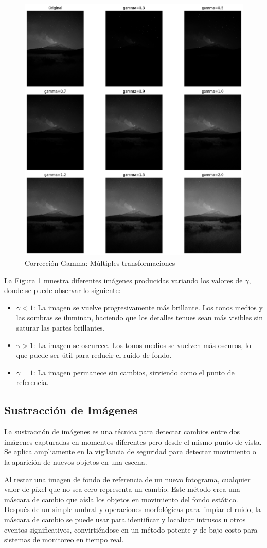 \documentclass[12pt,letterpaper]{article}
\begin{document}
\begin{figure}[H]
  \centering
  \includegraphics[width=0.5\linewidth]{figuras/correccion_gamma.png}
  \caption{Corrección Gamma: Múltiples transformaciones}
  \label{fig:correccion_gamma}
\end{figure}

La Figura \ref{fig:correccion_gamma} muestra diferentes imágenes producidas variando los valores de $\gamma$, donde se puede observar lo siguiente:

\begin{itemize}
  \item \textbf{$\gamma < 1$}: La imagen se vuelve progresivamente más brillante. Los tonos medios y las sombras se iluminan, haciendo que los detalles tenues sean más visibles sin saturar las partes brillantes.
  \item \textbf{$\gamma > 1$}: La imagen se oscurece. Los tonos medios se vuelven más oscuros, lo que puede ser útil para reducir el ruido de fondo.
  \item \textbf{$\gamma = 1$}: La imagen permanece sin cambios, sirviendo como el punto de referencia.
\end{itemize}

\subsection{Sustracción de Imágenes}

La sustracción de imágenes es una técnica para detectar cambios entre dos imágenes capturadas en momentos diferentes pero desde el mismo punto de vista. Se aplica ampliamente en la vigilancia de seguridad para detectar movimiento o la aparición de nuevos objetos en una escena.

Al restar una imagen de fondo de referencia de un nuevo fotograma, cualquier valor de píxel que no sea cero representa un cambio. Este método crea una máscara  de cambio que aísla los objetos en movimiento del fondo estático. Después de un simple umbral y operaciones morfológicas para limpiar el ruido, la máscara de cambio se puede usar para identificar y localizar intrusos u otros eventos significativos, convirtiéndose en un método potente y de bajo costo para sistemas de monitoreo en tiempo real.
\end{document}
